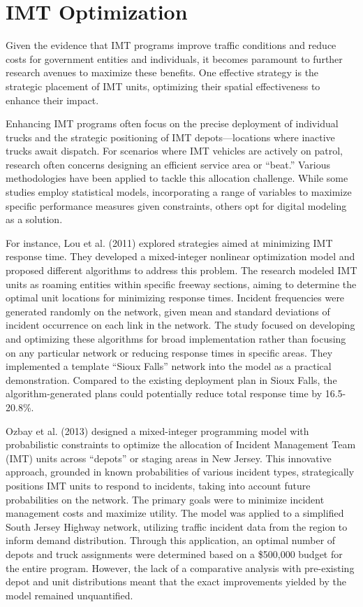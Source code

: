 \documentclass[fancy, oneside, mastersfancy, ms]{byuthesis}
\begin{document}
\hypertarget{imt-optimization}{%
\section{IMT Optimization}\label{imt-optimization}}

Given the evidence that IMT programs improve traffic conditions and
reduce costs for government entities and individuals, it becomes
paramount to further research avenues to maximize these benefits. One
effective strategy is the strategic placement of IMT units, optimizing
their spatial effectiveness to enhance their impact.

Enhancing IMT programs often focus on the precise deployment of
individual trucks and the strategic positioning of IMT
depots---locations where inactive trucks await dispatch. For scenarios
where IMT vehicles are actively on patrol, research often concerns
designing an efficient service area or ``beat.'' Various methodologies
have been applied to tackle this allocation challenge. While some
studies employ statistical models, incorporating a range of variables to
maximize specific performance measures given constraints, others opt for
digital modeling as a solution.

For instance, Lou et al. (2011) explored strategies aimed at minimizing
IMT response time. They developed a mixed-integer nonlinear optimization
model and proposed different algorithms to address this problem. The
research modeled IMT units as roaming entities within specific freeway
sections, aiming to determine the optimal unit locations for minimizing
response times. Incident frequencies were generated randomly on the
network, given mean and standard deviations of incident occurrence on
each link in the network. The study focused on developing and optimizing
these algorithms for broad implementation rather than focusing on any
particular network or reducing response times in specific areas. They
implemented a template ``Sioux Falls'' network into the model as a
practical demonstration. Compared to the existing deployment plan in
Sioux Falls, the algorithm-generated plans could potentially reduce
total response time by 16.5-20.8\%.

Ozbay et al. (2013) designed a mixed-integer programming model with
probabilistic constraints to optimize the allocation of Incident
Management Team (IMT) units across ``depots'' or staging areas in New
Jersey. This innovative approach, grounded in known probabilities of
various incident types, strategically positions IMT units to respond to
incidents, taking into account future probabilities on the network. The
primary goals were to minimize incident management costs and maximize
utility. The model was applied to a simplified South Jersey Highway
network, utilizing traffic incident data from the region to inform
demand distribution. Through this application, an optimal number of
depots and truck assignments were determined based on a \$500,000 budget
for the entire program. However, the lack of a comparative analysis with
pre-existing depot and unit distributions meant that the exact
improvements yielded by the model remained unquantified.
\end{document}
